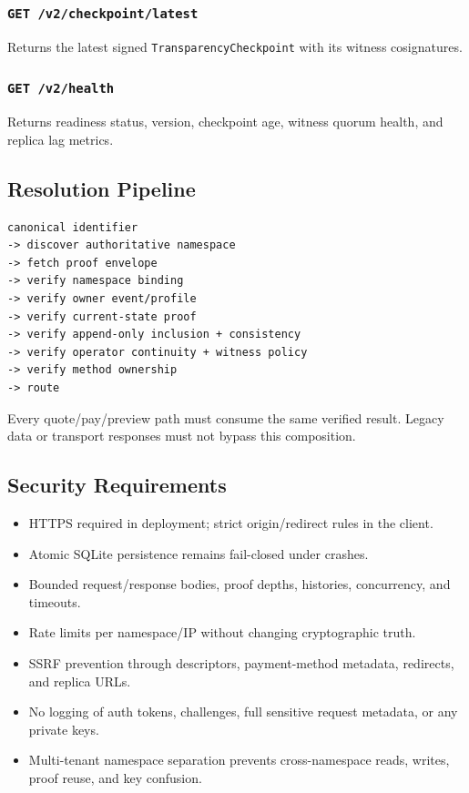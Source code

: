 \documentclass[
]{article}
\providecommand{\tightlist}{%
  \setlength{\itemsep}{0pt}\setlength{\parskip}{0pt}}
\begin{document}
\hypertarget{get-v2checkpointlatest}{%
\subsubsection{\texorpdfstring{\texttt{GET\ /v2/checkpoint/latest}}{GET /v2/checkpoint/latest}}\label{get-v2checkpointlatest}}

Returns the latest signed \texttt{TransparencyCheckpoint} with its
witness cosignatures.

\hypertarget{get-v2health}{%
\subsubsection{\texorpdfstring{\texttt{GET\ /v2/health}}{GET /v2/health}}\label{get-v2health}}

Returns readiness status, version, checkpoint age, witness quorum
health, and replica lag metrics.

\hypertarget{resolution-pipeline}{%
\subsection{Resolution Pipeline}\label{resolution-pipeline}}

\begin{verbatim}
canonical identifier
-> discover authoritative namespace
-> fetch proof envelope
-> verify namespace binding
-> verify owner event/profile
-> verify current-state proof
-> verify append-only inclusion + consistency
-> verify operator continuity + witness policy
-> verify method ownership
-> route
\end{verbatim}

Every quote/pay/preview path must consume the same verified result.
Legacy data or transport responses must not bypass this composition.

\hypertarget{security-requirements}{%
\subsection{Security Requirements}\label{security-requirements}}

\begin{itemize}
\tightlist
\item
  HTTPS required in deployment; strict origin/redirect rules in the
  client.
\item
  Atomic SQLite persistence remains fail-closed under crashes.
\item
  Bounded request/response bodies, proof depths, histories, concurrency,
  and timeouts.
\item
  Rate limits per namespace/IP without changing cryptographic truth.
\item
  SSRF prevention through descriptors, payment-method metadata,
  redirects, and replica URLs.
\item
  No logging of auth tokens, challenges, full sensitive request
  metadata, or any private keys.
\item
  Multi-tenant namespace separation prevents cross-namespace reads,
  writes, proof reuse, and key confusion.
\end{itemize}
\end{document}

